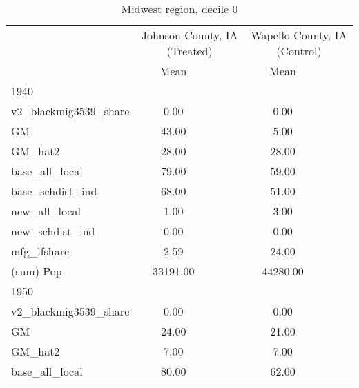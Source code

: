 \begin{table}[htbp]\centering
\def\sym#1{\ifmmode^{#1}\else\(^{#1}\)\fi}
\caption{Midwest region, decile 0 \label{tab1}}
\begin{tabular}{l*{2}{ccc}}
\toprule
                    &\multicolumn{3}{c}{Johnson County, IA (Treated)}&\multicolumn{3}{c}{Wapello County, IA (Control)}\\
                    &        Mean&            &            &        Mean&            &            \\
\midrule
1940                &            &            &            &            &            &            \\
v2\_blackmig3539\_share&        0.00&            &            &        0.00&            &            \\
GM                  &       43.00&            &            &        5.00&            &            \\
GM\_hat2             &       28.00&            &            &       28.00&            &            \\
base\_all\_local      &       79.00&            &            &       59.00&            &            \\
base\_schdist\_ind    &       68.00&            &            &       51.00&            &            \\
new\_all\_local       &        1.00&            &            &        3.00&            &            \\
new\_schdist\_ind     &        0.00&            &            &        0.00&            &            \\
mfg\_lfshare         &        2.59&            &            &       24.00&            &            \\
(sum) Pop           &    33191.00&            &            &    44280.00&            &            \\
\midrule
1950                &            &            &            &            &            &            \\
v2\_blackmig3539\_share&        0.00&            &            &        0.00&            &            \\
GM                  &       24.00&            &            &       21.00&            &            \\
GM\_hat2             &        7.00&            &            &        7.00&            &            \\
base\_all\_local      &       80.00&            &            &       62.00&            &            \\

\end{tabular}
\end{table}
